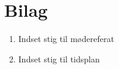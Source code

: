 \appendix
\section{Bilag}

\begin{enumerate}
	\item Indset stig til mødereferat \label{itm:Modereferat1}
	\item Indset stig til tidsplan \label{itm:Tidsplan1}
\end{enumerate}

